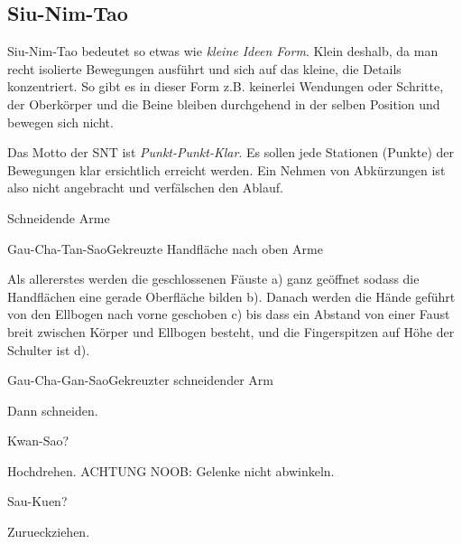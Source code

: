 \subsection{Siu-Nim-Tao}

Siu-Nim-Tao bedeutet so etwas wie \textit{kleine Ideen Form}. Klein deshalb, da man recht isolierte Bewegungen ausf\"uhrt und sich auf das kleine, die Details konzentriert. So gibt es in dieser Form z.B. keinerlei Wendungen oder Schritte, der Oberk\"orper und die Beine bleiben durchgehend in der selben Position und bewegen sich nicht.

Das Motto der SNT ist \textit{Punkt-Punkt-Klar}. Es sollen jede Stationen (Punkte) der Bewegungen klar ersichtlich erreicht werden. Ein Nehmen von Abk\"urzungen ist also nicht angebracht und verf\"alschen den Ablauf.
 


\begin{WTSatz}{Schneidende Arme}%

	\begin{WTSatzTeil}{Gau-Cha-Tan-Sao}{Gekreuzte Handfl\"ache nach oben Arme}
		
		Als allererstes werden die geschlossenen F\"auste a) ganz ge\"offnet sodass die Handfl\"achen eine gerade Oberfl\"ache bilden b). Danach werden die H\"ande gef\"uhrt von den Ellbogen nach vorne geschoben c) bis dass ein Abstand von einer Faust breit zwischen K\"orper und Ellbogen besteht, und die Fingerspitzen auf H\"ohe der Schulter ist d).
	\end{WTSatzTeil}
	
	\begin{WTSatzTeil}{Gau-Cha-Gan-Sao}{Gekreuzter schneidender Arm}
		
		Dann schneiden.
	\end{WTSatzTeil}
	
	\begin{WTSatzTeil}{Kwan-Sao}{?}
		
		Hochdrehen. ACHTUNG NOOB: Gelenke nicht abwinkeln.
	\end{WTSatzTeil}
	
	\begin{WTSatzTeil}{Sau-Kuen}{?}
		
		Zurueckziehen.
	\end{WTSatzTeil}

\end{WTSatz}

